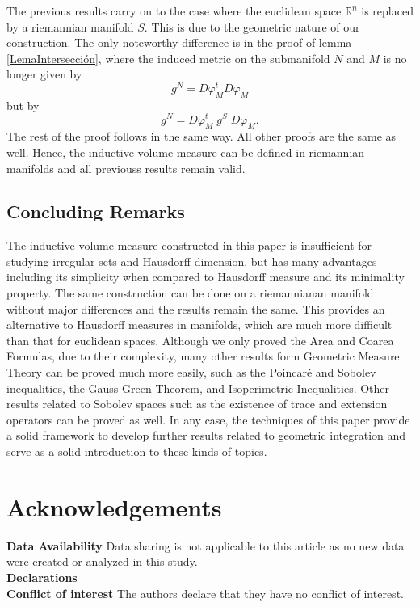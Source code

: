 \documentclass[%
 aip,
 amsmath,amssymb,
 reprint,%
jmp]{revtex4-2}
\begin{document}
The previous results carry on to the case where the euclidean space $\mathbb{R}^{n}$ is replaced by a riemannian manifold $S$. This is due to the geometric nature of our construction. The only noteworthy difference is in the proof of lemma \ref{LemaIntersección}, where the induced metric on the submanifold $N$ and $M$ is no longer given by
\begin{equation*}
    g^{N} = D\varphi_{M}^{t} D\varphi_{M}
\end{equation*}
but by
\begin{equation*}
    g^{N} = D\varphi_{M}^{t}\; g^{S}\; D\varphi_{M}.
\end{equation*}
The rest of the proof follows in the same way. All other proofs are the same as well. Hence, the inductive volume measure can be defined in riemannian manifolds and all previouss results remain valid.

\subsection{Concluding Remarks}

The inductive volume measure constructed in this paper is insufficient for studying irregular sets and Hausdorff dimension, but has many advantages including its simplicity when compared to Hausdorff measure and its minimality property. The same construction can be done on a riemannianan manifold without major differences and the results remain the same. This provides an alternative to Hausdorff measures in manifolds, which are much more difficult than that for euclidean spaces. Although we only proved the Area and Coarea Formulas, due to their complexity, many other results form Geometric Measure Theory can be proved much more easily, such as the Poincaré and Sobolev inequalities, the Gauss-Green Theorem, and Isoperimetric Inequalities. Other results related to Sobolev spaces such as the existence of trace and extension operators can be proved as well. In any case, the techniques of this paper provide a solid framework to develop further results related to geometric integration and serve as a solid introduction to these kinds of topics.

\section*{Acknowledgements}


\noindent \textbf{Data Availability} 
Data sharing is not applicable to this article as no new data were created or analyzed in this study.
\\


\noindent
\textbf{Declarations}\\

\noindent
\textbf{Conflict of interest} The authors declare that they have no conflict of interest.

\nocite{*}


\end{document}
